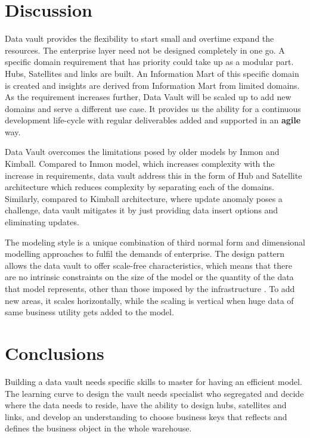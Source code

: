 \documentclass[conference]{IEEEtran}
\begin{document}
\section{Discussion}

Data vault provides the flexibility to start small and overtime expand the resources. The enterprise layer need not be designed completely in one go. A specific domain requirement that has priority could take up as a modular part. Hubs, Satellites and links are built. An Information Mart of this specific domain is created and insights are derived from Information Mart from limited domains. As the requirement increases further, Data Vault will be scaled up to add new domains and serve a different use case. It provides us the ability for a continuous development life-cycle with regular deliverables added and supported in an \textbf{agile} way.

Data Vault overcomes the limitations posed by older models by Inmon and Kimball. Compared to Inmon model, which increases complexity with the increase in requirements, data vault address this in the form of Hub and Satellite architecture which reduces complexity by separating each of the domains. Similarly, compared to Kimball architecture, where update anomaly poses a challenge, data vault mitigates it by just providing data insert options and eliminating updates.

The modeling style is a unique combination of third normal form and dimensional modelling approaches to fulfil the demands of enterprise. The design pattern allows the data vault to offer scale-free characteristics, which means that there are no intrinsic constraints on the size of the model or the quantity of the data that model represents, other than those imposed by the infrastructure \cite{b7}. To add new areas, it scales horizontally, while the scaling is vertical when huge data of same business utility gets added to the model.

\section{Conclusions}

Building a data vault needs specific skills to master for having an efficient model. The learning curve to design the vault needs specialist who segregated and decide where the data needs to reside, have the ability to design hubs, satellites and links, and develop an understanding to choose business keys that reflects and defines the business object in the whole warehouse.
\end{document}
